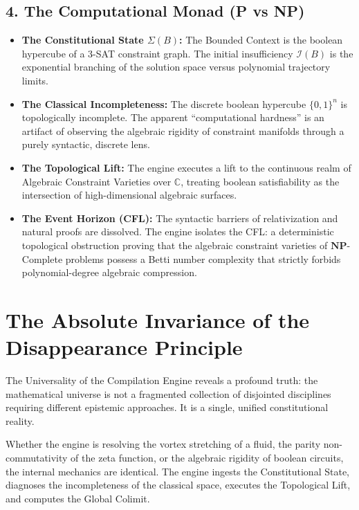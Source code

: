\documentclass[12pt,openany]{extbook}
\theoremstyle{plain}
\theoremstyle{definition}
\begin{document}
\subsection*{4. The Computational Monad (P vs NP)}
\begin{itemize}
    \item \textbf{The Constitutional State $\Sigma(B)$:} The Bounded Context is the boolean hypercube of a 3-SAT constraint graph. The initial insufficiency $\mathcal{I}(B)$ is the exponential branching of the solution space versus polynomial trajectory limits.
    \item \textbf{The Classical Incompleteness:} The discrete boolean hypercube $\{0,1\}^n$ is topologically incomplete. The apparent ``computational hardness'' is an artifact of observing the algebraic rigidity of constraint manifolds through a purely syntactic, discrete lens.
    \item \textbf{The Topological Lift:} The engine executes a lift to the continuous realm of Algebraic Constraint Varieties over $\mathbb{C}$, treating boolean satisfiability as the intersection of high-dimensional algebraic surfaces.
    \item \textbf{The Event Horizon (CFL):} The syntactic barriers of relativization and natural proofs are dissolved. The engine isolates the CFL: a deterministic topological obstruction proving that the algebraic constraint varieties of $\mathbf{NP}$-Complete problems possess a Betti number complexity that strictly forbids polynomial-degree algebraic compression.
\end{itemize}

\section{The Absolute Invariance of the Disappearance Principle}

The Universality of the Compilation Engine reveals a profound truth: the mathematical universe is not a fragmented collection of disjointed disciplines requiring different epistemic approaches. It is a single, unified constitutional reality.

Whether the engine is resolving the vortex stretching of a fluid, the parity non-commutativity of the zeta function, or the algebraic rigidity of boolean circuits, the internal mechanics are identical. The engine ingests the Constitutional State, diagnoses the incompleteness of the classical space, executes the Topological Lift, and computes the Global Colimit.
\end{document}
